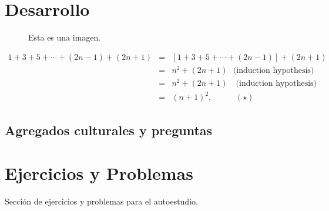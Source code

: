 \section{Desarrollo}

\begin{figure}[H]
    \centering
    
    \caption{Esta es una imagen.}
\end{figure}

\begin{eqnarray*}
    1+3+5+\cdots+(2n-1) + (2n+1) & = & \left[1+3+5+\cdots+(2n-1)\right]+(2n+1) \\
    & = & n^2 + (2n+1)~~~\mbox{(induction hypothesis)} \\
    & = & n^2 + (2n+1)\quad \text{(induction hypothesis)} \\
    & = & (n+1)^2. \quad\qquad (\star)
\end{eqnarray*}






\subsection{Agregados culturales y preguntas}






\section{Ejercicios y Problemas}
Sección de ejercicios y problemas para el autoestudio.
